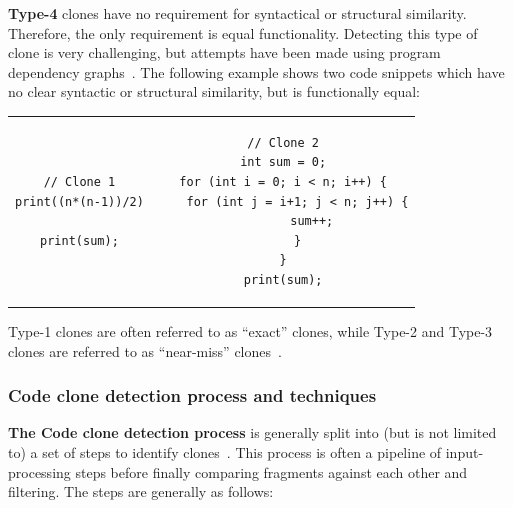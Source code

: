 \textbf{Type-4} clones have no requirement for syntactical or structural similarity.
Therefore, the only requirement is equal functionality. Detecting this type of clone is
very challenging, but attempts have been made using program dependency
graphs~\cite{SeedType4Detection}. The following example shows two code snippets which have
no clear syntactic or structural similarity, but is functionally equal:

\begin{tcolorbox}
	\begin{center}
		\begin{tabular}{c | c}
			\begin{lstlisting}
// Clone 1
print((n*(n-1))/2)

print(sum);
\end{lstlisting} &
			\begin{lstlisting}
// Clone 2
int sum = 0;
for (int i = 0; i < n; i++) {
    for (int j = i+1; j < n; j++) {
        sum++;
    }
}
print(sum);
\end{lstlisting}
		\end{tabular}
	\end{center}
\end{tcolorbox}


Type-1 clones are often referred to as ``exact'' clones, while Type-2 and Type-3 clones
are referred to as ``near-miss'' clones~\cite[1]{Zibran_real_time_search}.

\subsubsection{Code clone detection process and techniques}

\textbf{The Code clone detection process} is generally split into (but is not limited to)
a set of steps to identify clones~\cite{Inoue_introduction_to_cc}. This
process is often a pipeline of input-processing steps before finally comparing fragments
against each other and filtering. The steps are generally as follows:

